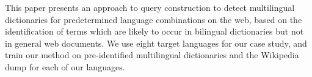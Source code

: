 This paper presents an approach to query construction to detect multilingual dictionaries for predetermined language combinations on the web, based on the identification of terms which are likely to occur in bilingual dictionaries but not in general web documents. We use eight target languages for our case study, and train our method on pre-identified multilingual dictionaries and the Wikipedia dump for each of our languages.
